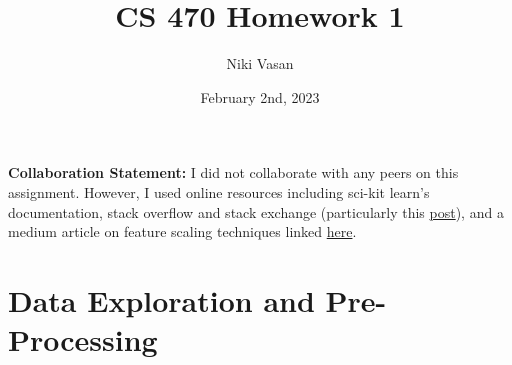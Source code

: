 \documentclass{article}
\title{CS 470 Homework 1}
\author{Niki Vasan}
\date{February 2nd, 2023}
\begin{document}
\maketitle

\textbf{Collaboration Statement:} I did not collaborate with any peers on this assignment. However, I used online resources including sci-kit learn's documentation, stack overflow and stack exchange (particularly this \href{https://stackoverflow.com/questions/39421202/adding-a-grouped-by-zscore-column-to-a-pandas-dataframe}{post}), and a medium article on feature scaling techniques linked \href {https://towardsdatascience.com/data-normalization-with-pandas-and-scikit-learn-7c1cc6ed6475}{here}.

\section{Data Exploration and Pre-Processing}
\end{document}
